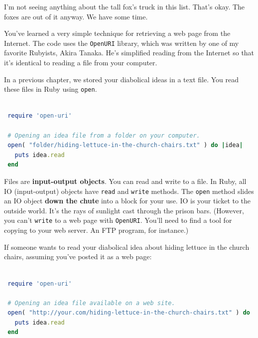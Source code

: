 \documentclass[10pt,twoside]{report}
\begin{document}
I'm not seeing anything about the tall fox's truck in this list.
That's okay. The foxes are out of it anyway.  We have some time.

You've learned a very simple technique for retrieving a web page from
the Internet.  The code uses the \lstinline[breaklines=true]|OpenURI|
library, which was written by one of my favorite Rubyists, Akira
Tanaka.  He's simplified reading from the Internet so that it's
identical to reading a file from your computer.

In a previous chapter, we stored your diabolical ideas in a text file.
You read these files in Ruby using \lstinline[breaklines=true]|open|.


\begin{lstlisting}[basicstyle=\ttfamily\color{basiccolor},
    commentstyle = \ttfamily\color{commentcolor},
    keywordstyle=\ttfamily\color{keywordscolor},
    stringstyle=\color{stringcolor},
    language=Ruby,
    basicstyle=\small\ttfamily,
    showstringspaces=false,
  ]

 require 'open-uri'

 # Opening an idea file from a folder on your computer.
 open( "folder/hiding-lettuce-in-the-church-chairs.txt" ) do |idea|
   puts idea.read
 end

\end{lstlisting}


Files are {\bf input-output objects}.  You can read and write to a
file.  In Ruby, all IO (input-output) objects have
\lstinline[breaklines=true]|read| and
\lstinline[breaklines=true]|write| methods.  The
\lstinline[breaklines=true]|open| method slides an IO object {\bf down
  the chute} into a block for your use.  IO is your ticket to the
outside world.  It's the rays of sunlight cast through the prison
bars.  (However, you can't \lstinline[breaklines=true]|write| to a web
page with \lstinline[breaklines=true]|OpenURI|.  You'll need to find a
tool for copying to your web server.  An FTP program, for instance.)

If someone wants to read your diabolical idea about hiding lettuce in
the church chairs, assuming you've posted it as a web page:


\begin{lstlisting}[basicstyle=\ttfamily\color{basiccolor},
    commentstyle = \ttfamily\color{commentcolor},
    keywordstyle=\ttfamily\color{keywordscolor},
    stringstyle=\color{stringcolor},
    language=Ruby,
    basicstyle=\small\ttfamily,
    showstringspaces=false,
  ]

 require 'open-uri'

 # Opening an idea file available on a web site.
 open( "http://your.com/hiding-lettuce-in-the-church-chairs.txt" ) do |idea|
   puts idea.read
 end

\end{lstlisting}
\end{document}
